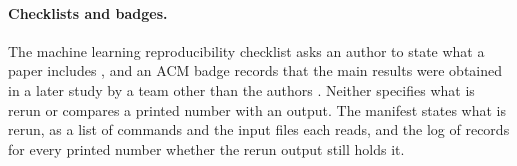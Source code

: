 \paragraph{Checklists and badges.} The machine learning reproducibility checklist asks an author
to state what a paper includes \citep{pineau2020improving}, and an ACM badge records that
the main results were obtained in a later study by a team other than the authors
\citep{acm2020badging}. Neither specifies what is rerun or
compares a printed number with an output. The  manifest states what is rerun, as a
list of commands and the input files each reads, and the log of  records
for every printed number whether the rerun output still holds it.
